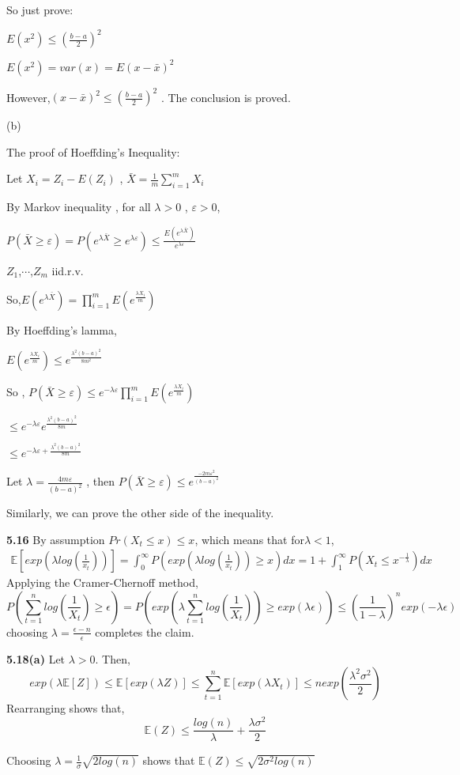 So just prove:

$E(x^2)\leq (\frac{b-a}{2})^2$

$E(x^2)=var(x)=E(x-\bar{x})^2$

However,$(x-\bar{x})^2\leq(\frac{b-a}{2})^2$ . The conclusion is proved.

(b)

The proof of Hoeffding's Inequality:

Let $X_i = Z_i - E(Z_i)$ , $\bar{X} = \frac{1}{m}\sum_{i=1}^{m}X_i$

By Markov inequality , for all $\lambda >0$ , $\varepsilon > 0$,

$P(\bar{X}\geq\varepsilon) = P(e^{\lambda \bar{X}} \geq e^{\lambda\varepsilon}) \leq \frac{E(e^{\lambda \bar{X}})}{e^{\lambda\varepsilon}}$

$Z_1$,$\cdots$,$Z_m$ iid.r.v.

So,$E(e^{\lambda \bar{X}}) = \prod_{i=1}^{m} E(e^{\frac{\lambda X_i}{m}})$

By Hoeffding's lamma,

$ E(e^{\frac{\lambda X_i}{m}}) \leq e^{\frac{\lambda^2(b-a)^2}{8m^2}}$

So , $P(\bar{X}\geq\varepsilon) \leq e^{-\lambda\varepsilon}\prod_{i=1}^{m} E(e^{\frac{\lambda X_i}{m}})$

$\leq e^{-\lambda\varepsilon}e^{\frac{\lambda^2(b-a)^2}{8m}}$

$\leq e^{-\lambda\varepsilon+\frac{\lambda^2(b-a)^2}{8m}}$

Let $\lambda = \frac{4m\varepsilon}{(b-a)^2}$ , then $P(\bar{X}\geq \varepsilon) \leq e^{\frac{-2m\varepsilon^2}{(b-a)^2}}$

Similarly, we can prove the other side of the inequality.


\noindent \textbf{5.16}
By assumption $Pr(X_t\leq x)\leq x$, which means that for$\lambda <1$,
\begin{align}
\mathbb{E}\left[exp(\lambda log(\frac{1}{x_t}))\right] = \int_0^\infty P(exp(\lambda log(\frac{1}{x_t}))\geq x)dx = 1 +\int_1^\infty P(X_t \leq x^{-\frac{1}{\lambda}})dx
\end{align}
Applying the Cramer-Chernoff method,
$$P\left(\sum_{t=1}^n log(\frac{1}{X_t}) \geq \epsilon\right) = P\left(exp(\lambda \sum_{t=1}^n log(\frac{1}{X_t})) \geq exp(\lambda \epsilon) \right) \leq \left(\frac{1}{1-\lambda}\right)^n exp (-\lambda \epsilon)$$
choosing $\lambda  = \frac{\epsilon-n}{\epsilon}$ completes the claim.



\noindent \textbf{5.18(a)}
Let $\lambda >0$. Then,
$$exp(\lambda \mathbb{E}[Z]) \leq \mathbb{E}[exp(\lambda Z)] \leq \sum_{t=1}^n \mathbb{E}[exp(\lambda X_t)] \leq n exp(\frac{\lambda^2 \sigma^2}{2})$$
\noindent
Rearranging shows that,
$$\mathbb{E}(Z) \leq \frac{log(n)}{\lambda} + \frac{\lambda \sigma^2}{2}$$
\newline

\noindent
Choosing $\lambda = \frac{1}{\sigma} \sqrt{2log(n)}$ shows  that $
\mathbb{E}(Z) \leq \sqrt{2\sigma^2 log(n)}$
